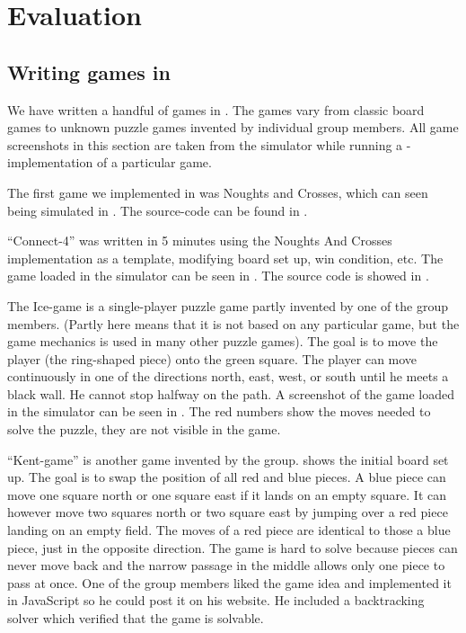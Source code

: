 \chapter{Evaluation}
\label{chap:evaluation}

\section{Writing games in \productname}
We have written a handful of games in \productname{}. The games vary from classic board games to unknown puzzle games invented by individual group members. All game screenshots in this section are taken from the simulator while running a \productname{}-implementation of a particular game. 

The first game we implemented in \productname was Noughts and Crosses, which can seen being simulated in . The source-code can be found in .



``Connect-4'' was written in 5 minutes using the Noughts And Crosses implementation as a template, modifying board set up, win condition, etc. The game loaded in the simulator can be seen in . The source code is showed in .



The Ice-game is a single-player puzzle game partly invented by one of the group members. (Partly here means that it is not based on any particular game, but the game mechanics is used in many other puzzle games). The goal is to move the player (the ring-shaped piece) onto the green square. The player can move continuously in one of the directions north, east, west, or south until he meets a black wall. He cannot stop halfway on the path. A screenshot of the game loaded in the simulator can be seen in . The red numbers show the moves needed to solve the puzzle, they are not visible in the game.


``Kent-game'' is another game invented by the group.  shows the initial board set up. The goal is to swap the position of all red and blue pieces. A blue piece can move one square north or one square east if it lands on an empty square. It can however move two squares north or two square east by jumping over a red piece landing on an empty field. The moves of a red piece are identical to those a blue piece, just in the opposite direction. The game is hard to solve because pieces can never move back and the narrow passage in the middle allows only one piece to pass at once. One of the group members liked the game idea and implemented it in JavaScript so he could post it on his website. He included a backtracking solver which verified that the game is solvable.

